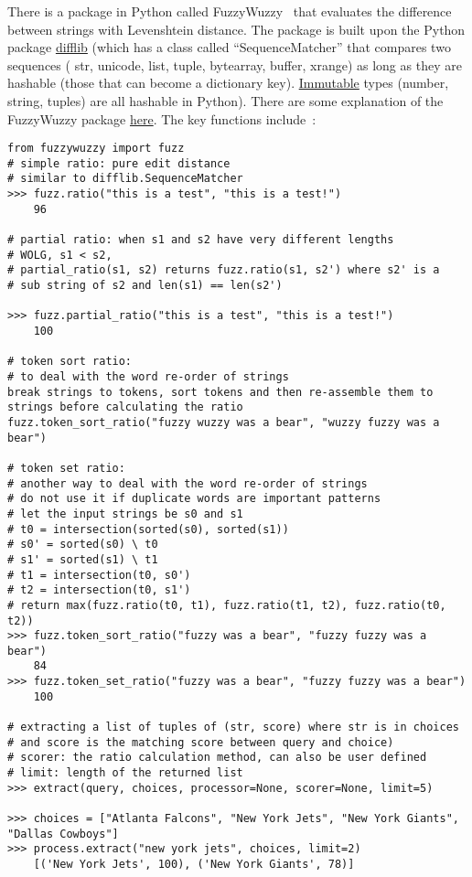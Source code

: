 \documentclass[12pt]{article}
\begin{document}
There is a package in Python called FuzzyWuzzy~\cite{fuzzyWuzzy2015}
that evaluates the difference between strings with Levenshtein
distance. The package is built upon the Python package
\href{https://docs.python.org/2/library/difflib.html}{difflib} (which
has a class called ``SequenceMatcher'' that compares two sequences (
str, unicode, list, tuple, bytearray, buffer, xrange) as long as they
are hashable (those that can become a dictionary
key). \href{https://docs.python.org/2/glossary.html#term-immutable}{Immutable}
types (number, string, tuples) are all hashable in Python). There are
some explanation of the FuzzyWuzzy package
\href{http://chairnerd.seatgeek.com/fuzzywuzzy-fuzzy-string-matching-in-python/}{here}. The
key functions include~\cite{fuzzyWuzzyGit2015}:
\makeatletter
\def\verbatim@font{\linespread{1}\small\ttfamily}
\makeatother
\begin{verbatim}
from fuzzywuzzy import fuzz
# simple ratio: pure edit distance
# similar to difflib.SequenceMatcher
>>> fuzz.ratio("this is a test", "this is a test!")
    96

# partial ratio: when s1 and s2 have very different lengths 
# WOLG, s1 < s2,
# partial_ratio(s1, s2) returns fuzz.ratio(s1, s2') where s2' is a
# sub string of s2 and len(s1) == len(s2')

>>> fuzz.partial_ratio("this is a test", "this is a test!")
    100

# token sort ratio: 
# to deal with the word re-order of strings
break strings to tokens, sort tokens and then re-assemble them to strings before calculating the ratio
fuzz.token_sort_ratio("fuzzy wuzzy was a bear", "wuzzy fuzzy was a bear")

# token set ratio: 
# another way to deal with the word re-order of strings
# do not use it if duplicate words are important patterns
# let the input strings be s0 and s1
# t0 = intersection(sorted(s0), sorted(s1))
# s0' = sorted(s0) \ t0
# s1' = sorted(s1) \ t1
# t1 = intersection(t0, s0')
# t2 = intersection(t0, s1')
# return max(fuzz.ratio(t0, t1), fuzz.ratio(t1, t2), fuzz.ratio(t0, t2))
>>> fuzz.token_sort_ratio("fuzzy was a bear", "fuzzy fuzzy was a bear")
    84
>>> fuzz.token_set_ratio("fuzzy was a bear", "fuzzy fuzzy was a bear")
    100

# extracting a list of tuples of (str, score) where str is in choices 
# and score is the matching score between query and choice)
# scorer: the ratio calculation method, can also be user defined
# limit: length of the returned list
>>> extract(query, choices, processor=None, scorer=None, limit=5)

>>> choices = ["Atlanta Falcons", "New York Jets", "New York Giants", "Dallas Cowboys"]
>>> process.extract("new york jets", choices, limit=2)
    [('New York Jets', 100), ('New York Giants', 78)]
\end{verbatim}
\end{document}
